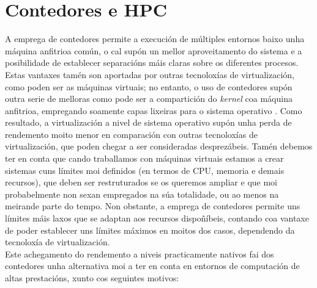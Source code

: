\section{Contedores e \gls{HPC}}

A emprega de contedores permite a execución de múltiples entornos baixo unha máquina anfitrioa común, o cal supón un mellor aproveitamento do sistema e a posibilidade de establecer separacións máis claras sobre os diferentes procesos. Estas vantaxes tamén son aportadas por outras tecnoloxías de virtualización, como poden ser as máquinas virtuais; no entanto, o uso de contedores supón outra serie de melloras como pode ser a compartición do \textit{kernel} coa máquina anfitrioa, empregando soamente capas lixeiras para o sistema operativo \cite{OS-level-security}. Como resultado, a virtualización a nivel de sistema operativo supón unha perda de rendemento moito menor en comparación con outras tecnoloxías de virtualización, que poden chegar a ser consideradas desprezábeis. Tamén debemos ter en conta que cando traballamos con máquinas virtuais estamos a crear sistemas cuns límites moi definidos (en termos de CPU, memoria e demais recursos), que deben ser restruturados se os queremos ampliar e que moi probabelmente non sexan empregados na súa totalidade, ou ao menos na meirande parte do tempo. Non obstante, a emprega de contedores permite uns límites máis laxos que se adaptan aos recursos dispoñíbeis, contando coa vantaxe de poder establecer uns límites máximos en moitos dos casos, dependendo da tecnoloxía de virtualización.\\

Este achegamento do rendemento a niveis practicamente nativos fai dos contedores unha alternativa moi a ter en conta en entornos de computación de altas prestacións, xunto cos seguintes motivos:

